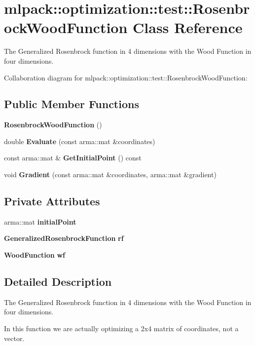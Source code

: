 \section{mlpack\-:\-:optimization\-:\-:test\-:\-:Rosenbrock\-Wood\-Function Class Reference}
\label{classmlpack_1_1optimization_1_1test_1_1RosenbrockWoodFunction}


The Generalized Rosenbrock function in 4 dimensions with the Wood Function in four dimensions.  




Collaboration diagram for mlpack\-:\-:optimization\-:\-:test\-:\-:Rosenbrock\-Wood\-Function\-:
\subsection*{Public Member Functions}
\begin{DoxyCompactItemize}
\item 
{\bf Rosenbrock\-Wood\-Function} ()
\item 
double {\bf Evaluate} (const arma\-::mat \&coordinates)
\item 
const arma\-::mat \& {\bf Get\-Initial\-Point} () const 
\item 
void {\bf Gradient} (const arma\-::mat \&coordinates, arma\-::mat \&gradient)
\end{DoxyCompactItemize}
\subsection*{Private Attributes}
\begin{DoxyCompactItemize}
\item 
arma\-::mat {\bf initial\-Point}
\item 
{\bf Generalized\-Rosenbrock\-Function} {\bf rf}
\item 
{\bf Wood\-Function} {\bf wf}
\end{DoxyCompactItemize}


\subsection{Detailed Description}
The Generalized Rosenbrock function in 4 dimensions with the Wood Function in four dimensions. 

In this function we are actually optimizing a 2x4 matrix of coordinates, not a vector. 

